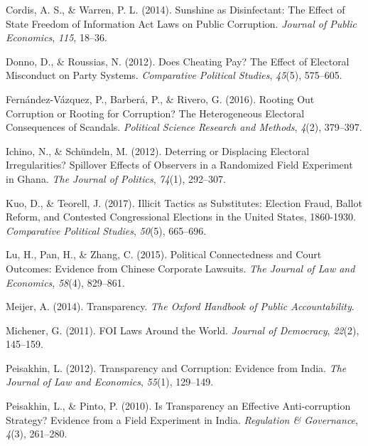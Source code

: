 \documentclass[]{article}
\begin{document}
\leavevmode\hypertarget{ref-CordisSunshineDisinfectantEffect2014}{}%
Cordis, A. S., \& Warren, P. L. (2014). Sunshine as Disinfectant: The
Effect of State Freedom of Information Act Laws on Public Corruption.
\emph{Journal of Public Economics}, \emph{115}, 18--36.

\leavevmode\hypertarget{ref-DonnoDoesCheatingPay2012}{}%
Donno, D., \& Roussias, N. (2012). Does Cheating Pay? The Effect of
Electoral Misconduct on Party Systems. \emph{Comparative Political
Studies}, \emph{45}(5), 575--605.

\leavevmode\hypertarget{ref-Fernandez-VazquezRootingOutCorruption2016}{}%
Fernández-Vázquez, P., Barberá, P., \& Rivero, G. (2016). Rooting Out
Corruption or Rooting for Corruption? The Heterogeneous Electoral
Consequences of Scandals. \emph{Political Science Research and Methods},
\emph{4}(2), 379--397.

\leavevmode\hypertarget{ref-IchinoDeterringDisplacingElectoral2012}{}%
Ichino, N., \& Schündeln, M. (2012). Deterring or Displacing Electoral
Irregularities? Spillover Effects of Observers in a Randomized Field
Experiment in Ghana. \emph{The Journal of Politics}, \emph{74}(1),
292--307.

\leavevmode\hypertarget{ref-KuoIllicitTacticsSubstitutes2017}{}%
Kuo, D., \& Teorell, J. (2017). Illicit Tactics as Substitutes: Election
Fraud, Ballot Reform, and Contested Congressional Elections in the
United States, 1860-1930. \emph{Comparative Political Studies},
\emph{50}(5), 665--696.

\leavevmode\hypertarget{ref-LuPoliticalConnectednessCourt2015}{}%
Lu, H., Pan, H., \& Zhang, C. (2015). Political Connectedness and Court
Outcomes: Evidence from Chinese Corporate Lawsuits. \emph{The Journal of
Law and Economics}, \emph{58}(4), 829--861.

\leavevmode\hypertarget{ref-MeijerTransparency2014}{}%
Meijer, A. (2014). Transparency. \emph{The Oxford Handbook of Public
Accountability}.

\leavevmode\hypertarget{ref-MichenerFOILawsWorld2011}{}%
Michener, G. (2011). FOI Laws Around the World. \emph{Journal of
Democracy}, \emph{22}(2), 145--159.

\leavevmode\hypertarget{ref-PeisakhinTransparencyCorruptionEvidence2012}{}%
Peisakhin, L. (2012). Transparency and Corruption: Evidence from India.
\emph{The Journal of Law and Economics}, \emph{55}(1), 129--149.

\leavevmode\hypertarget{ref-PeisakhinTransparencyEffectiveAnticorruption2010}{}%
Peisakhin, L., \& Pinto, P. (2010). Is Transparency an Effective
Anti-corruption Strategy? Evidence from a Field Experiment in India.
\emph{Regulation \& Governance}, \emph{4}(3), 261--280.
\end{document}
